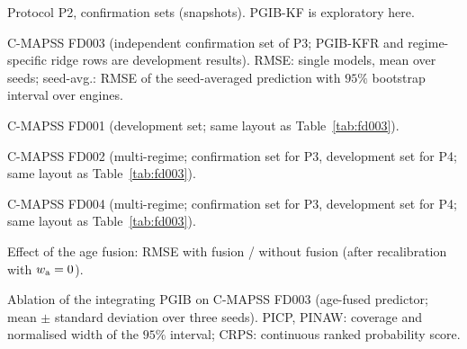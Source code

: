 \documentclass[preprint,12pt]{elsarticle}
\theoremstyle{definition}
\begin{document}
\begin{table}
\caption{Protocol P2, confirmation sets (snapshots). PGIB-KF is exploratory here.}
\centering\small

\label{tab:conf}
\end{table}

\begin{table}
\caption{C-MAPSS FD003 (independent confirmation set of P3; PGIB-KFR and regime-specific ridge rows are development results). RMSE: single models, mean over seeds; seed-avg.: RMSE of the seed-averaged prediction with $95\%$ bootstrap interval over engines.}
\centering\small
{}
\label{tab:fd003}
\end{table}

\begin{table}
\caption{C-MAPSS FD001 (development set; same layout as Table~\ref{tab:fd003}).}
\centering\small
{}
\label{tab:fd001}
\end{table}

\begin{table}
\caption{C-MAPSS FD002 (multi-regime; confirmation set for P3, development set for P4; same layout as Table~\ref{tab:fd003}).}
\centering\small
{}
\label{tab:fd002}
\end{table}

\begin{table}
\caption{C-MAPSS FD004 (multi-regime; confirmation set for P3, development set for P4; same layout as Table~\ref{tab:fd003}).}
\centering\small
{}
\label{tab:fd004}
\end{table}

\begin{table}
\caption{Effect of the age fusion: RMSE with fusion / without fusion (after recalibration with $w_{\rm a}=0$).}
\centering\small
{}
\label{tab:fusion}
\end{table}

\begin{table}
\caption{Ablation of the integrating PGIB on C-MAPSS FD003 (age-fused predictor; mean $\pm$ standard deviation over three seeds). PICP, PINAW: coverage and normalised width of the $95\%$ interval; CRPS: continuous ranked probability score.}
\centering\scriptsize
{}
\label{tab:ablfd003}
\end{table}
\end{document}
